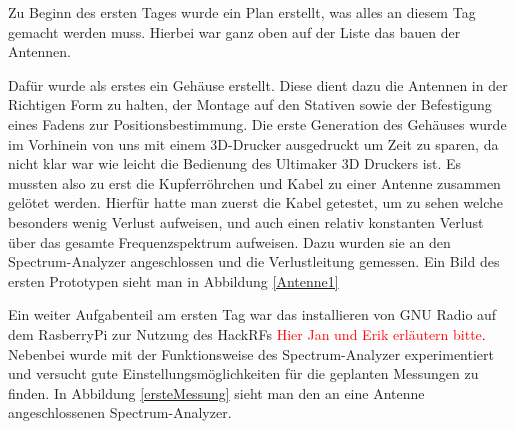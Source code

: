 \documentclass[titlepage,11pt,a4paper,ngerman]{article}
\begin{document}
Zu Beginn des ersten Tages wurde ein Plan erstellt, was alles an diesem Tag gemacht werden muss. Hierbei war ganz oben auf der Liste das bauen der Antennen.\par
Dafür wurde als erstes ein Gehäuse erstellt. Diese dient dazu die Antennen in der Richtigen Form zu halten, der Montage auf den Stativen sowie der Befestigung eines Fadens zur Positionsbestimmung. Die erste Generation des Gehäuses wurde im Vorhinein von uns mit einem 3D-Drucker ausgedruckt um Zeit zu sparen, da nicht klar war wie leicht die Bedienung des Ultimaker 3D Druckers ist. Es mussten also zu erst die Kupferröhrchen und Kabel zu einer Antenne zusammen gelötet werden. Hierfür hatte man zuerst die Kabel getestet, um zu sehen welche besonders wenig Verlust aufweisen, und auch einen relativ konstanten Verlust über das gesamte Frequenzspektrum aufweisen. Dazu wurden sie an den Spectrum-Analyzer angeschlossen und die Verlustleitung gemessen. Ein Bild des ersten Prototypen sieht man in Abbildung \ref{Antenne1}\par
Ein weiter Aufgabenteil am ersten Tag war das installieren von GNU Radio auf dem RasberryPi zur Nutzung des HackRFs \textcolor{red}{Hier Jan und Erik erläutern bitte}. Nebenbei wurde mit der Funktionsweise des Spectrum-Analyzer experimentiert und versucht gute Einstellungsmöglichkeiten für die geplanten Messungen zu finden. In Abbildung \ref{ersteMessung} sieht man den an eine Antenne angeschlossenen Spectrum-Analyzer. 
\end{document}
